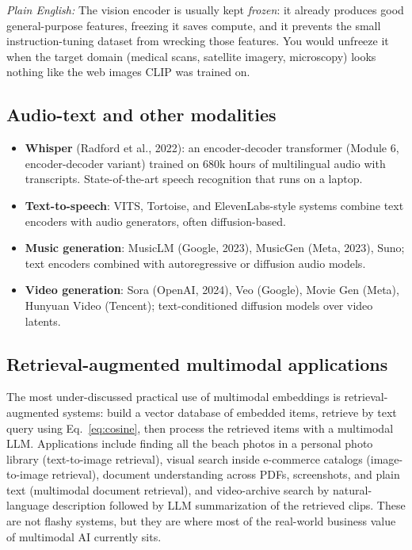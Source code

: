 \documentclass[11pt]{article}
\theoremstyle{remark}
\newcommand{\plain}[1]{\medskip\noindent\textit{Plain English:} #1\medskip}
\begin{document}
\plain{The vision encoder is usually kept \emph{frozen}: it already produces good general-purpose features, freezing it saves compute, and it prevents the small instruction-tuning dataset from wrecking those features. You would unfreeze it when the target domain (medical scans, satellite imagery, microscopy) looks nothing like the web images CLIP was trained on.}

\subsection{Audio-text and other modalities}
\begin{itemize}[leftmargin=1.4em]
  \item \textbf{Whisper} (Radford et al., 2022): an encoder-decoder transformer (Module 6, encoder-decoder variant) trained on 680k hours of multilingual audio with transcripts. State-of-the-art speech recognition that runs on a laptop.
  \item \textbf{Text-to-speech}: VITS, Tortoise, and ElevenLabs-style systems combine text encoders with audio generators, often diffusion-based.
  \item \textbf{Music generation}: MusicLM (Google, 2023), MusicGen (Meta, 2023), Suno; text encoders combined with autoregressive or diffusion audio models.
  \item \textbf{Video generation}: Sora (OpenAI, 2024), Veo (Google), Movie Gen (Meta), Hunyuan Video (Tencent); text-conditioned diffusion models over video latents.
\end{itemize}

\subsection{Retrieval-augmented multimodal applications}
The most under-discussed practical use of multimodal embeddings is retrieval-augmented systems: build a vector database of embedded items, retrieve by text query using Eq.~\eqref{eq:cosine}, then process the retrieved items with a multimodal LLM. Applications include finding all the beach photos in a personal photo library (text-to-image retrieval), visual search inside e-commerce catalogs (image-to-image retrieval), document understanding across PDFs, screenshots, and plain text (multimodal document retrieval), and video-archive search by natural-language description followed by LLM summarization of the retrieved clips. These are not flashy systems, but they are where most of the real-world business value of multimodal AI currently sits.
\end{document}
